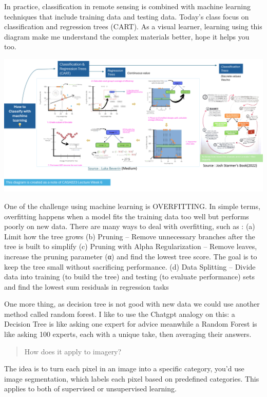 \documentclass[
  letterpaper,
  DIV=11,
  numbers=noendperiod]{scrreprt}
\begin{document}
In practice, classification in remote sensing is combined with machine
learning techniques that include training data and testing data. Today's
class focus on classification and regression trees (CART). As a visual
learner, learning using this diagram make me understand the complex
materials better, hope it helps you too.

\includegraphics{images/clipboard-2998853873.png}

One of the challenge using machine learning is OVERFITTING. In simple
terms, overfitting happens when a model fits the training data too well
but performs poorly on new data. There are many ways to deal with
overfitting, such as : (a) Limit how the tree grows (b) Pruning --
Remove unnecessary branches after the tree is built to simplify (c)
Pruning with Alpha Regularization -- Remove leaves, increase the pruning
parameter (α) and find the lowest tree score. The goal is to keep the
tree small without sacrificing performance. (d) Data Splitting -- Divide
data into training (to build the tree) and testing (to evaluate
performance) sets and find the lowest sum residuals in regression tasks

One more thing, as decision tree is not good with new data we could use
another method called random forest. I like to use the Chatgpt analogy
on this: a Decision Tree is like asking one expert for advice meanwhile
a Random Forest is like asking 100 experts, each with a unique take,
then averaging their answers.

\begin{quote}
How does it apply to imagery?
\end{quote}

The idea is to turn each pixel in an image into a specific category,
you'd use image segmentation, which labels each pixel based on
predefined categories. This applies to both of supervised or
unsupervised learning.
\end{document}
